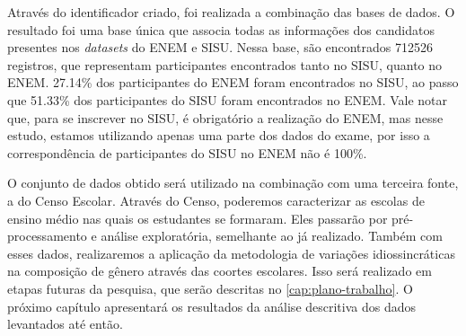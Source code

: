 Através do identificador criado, foi realizada a combinação das bases de dados. O resultado foi uma base única que associa todas as informações dos candidatos presentes nos \textit{datasets} do ENEM e SISU. Nessa base, são encontrados 712526 registros, que representam participantes encontrados tanto no SISU, quanto no ENEM. 27.14\% dos participantes do ENEM foram encontrados no SISU, ao passo que 51.33\% dos participantes do SISU foram encontrados no ENEM. Vale notar que, para se inscrever no SISU, é obrigatório a realização do ENEM, mas nesse estudo, estamos utilizando apenas uma parte dos dados do exame, por isso a correspondência de participantes do SISU no ENEM não é 100\%.

O conjunto de dados obtido será utilizado na combinação com uma terceira fonte, a do Censo Escolar. Através do Censo, poderemos caracterizar as escolas de ensino médio nas quais os estudantes se formaram. Eles passarão por pré-processamento e análise exploratória, semelhante ao já realizado. Também com esses dados, realizaremos a aplicação da metodologia de variações idiossincráticas na composição de gênero através das coortes escolares. Isso será realizado em etapas futuras da pesquisa, que serão descritas no \autoref{cap:plano-trabalho}. O próximo capítulo apresentará os resultados da análise descritiva dos dados levantados até então. 